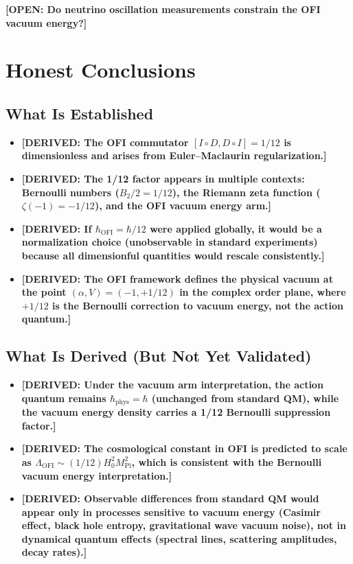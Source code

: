 \documentclass[12pt]{article}
\theoremstyle{definition}
\newcommand{\Mpl}{M_{\mathrm{Pl}}}
\newcommand{\DERIVED}[1]{\textcolor{derivedcolor}{\textbf{[DERIVED: #1]}}}
\newcommand{\OPEN}[1]{\textcolor{opencolor}{\textbf{[OPEN: #1]}}}
\begin{document}
\OPEN{Do neutrino oscillation measurements constrain the OFI vacuum energy?}

\section{Honest Conclusions}
\label{sec:conclusions}

\subsection{What Is Established}

\begin{itemize}
  \item \DERIVED{The OFI commutator $[I\circ D, D\circ I] = 1/12$ is dimensionless
    and arises from Euler--Maclaurin regularization.}

  \item \DERIVED{The 1/12 factor appears in multiple contexts: Bernoulli numbers
    ($B_2/2 = 1/12$), the Riemann zeta function ($\zeta(-1) = -1/12$), and the
    OFI vacuum energy arm.}

  \item \DERIVED{If $\hbar_{\mathrm{OFI}} = \hbar/12$ were applied globally, it would
    be a normalization choice (unobservable in standard experiments) because all
    dimensionful quantities would rescale consistently.}

  \item \DERIVED{The OFI framework defines the physical vacuum at the point
    $(\alpha, V) = (-1, +1/12)$ in the complex order plane, where $+1/12$ is the
    Bernoulli correction to vacuum energy, not the action quantum.}
\end{itemize}

\subsection{What Is Derived (But Not Yet Validated)}

\begin{itemize}
  \item \DERIVED{Under the vacuum arm interpretation, the action quantum remains
    $\hbar_{\mathrm{phys}} = \hbar$ (unchanged from standard QM), while the vacuum
    energy density carries a 1/12 Bernoulli suppression factor.}

  \item \DERIVED{The cosmological constant in OFI is predicted to scale as
    $\Lambda_{\mathrm{OFI}} \sim (1/12) H_0^2 \Mpl^2$, which is consistent with
    the Bernoulli vacuum energy interpretation.}

  \item \DERIVED{Observable differences from standard QM would appear only in
    processes sensitive to vacuum energy (Casimir effect, black hole entropy,
    gravitational wave vacuum noise), not in dynamical quantum effects
    (spectral lines, scattering amplitudes, decay rates).}
\end{itemize}
\end{document}
